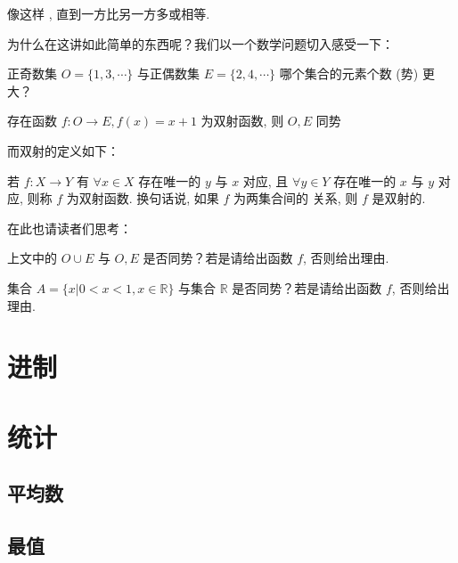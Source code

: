像这样 , 直到一方比另一方多或相等.

为什么在这讲如此简单的东西呢？我们以一个数学问题切入感受一下：

\begin{question}
  正奇数集 $O = \{1, 3, \cdots\}$ 与正偶数集 $E = \{2, 4, \cdots\}$ 哪个集合的元素个数 (势) 更大？
\end{question}

\begin{solution}
  存在函数 $f: O \to E, f(x) = x + 1$ 为双射函数, 则 $O, E$ 同势
\end{solution}

而双射的定义如下：

\begin{definition}[双射函数]
  若 $f: X \to Y$ 有 $\forall x \in X$ 存在唯一的 $y$ 与 $x$ 对应, 且 $\forall y \in Y$ 存在唯一的 $x$ 与 $y$ 对应, 则称 $f$ 为双射函数. 换句话说, 如果 $f$ 为两集合间的  关系, 则 $f$ 是双射的.
\end{definition}

在此也请读者们思考：

\begin{problem}[\ref{ans:odd-even-union}] \label{prob:odd-even-union}
上文中的 $O \cup E$ 与 $O, E$ 是否同势？若是请给出函数 $f$, 否则给出理由.
\end{problem}

\begin{problem}[\ref{ans:real-number-interval}] \label{prob:real-number-interval}
集合 $A = \{x | 0 < x < 1, x \in \mathbb{R}\}$ 与集合 $\mathbb{R}$ 是否同势？若是请给出函数 $f$, 否则给出理由.
\end{problem}

\section{进制} \label{sec:base}

\section{统计} \label{sec:statistics}

\subsection{平均数} \label{subsec:mean}

\subsection{最值} \label{subsec:max-min}

